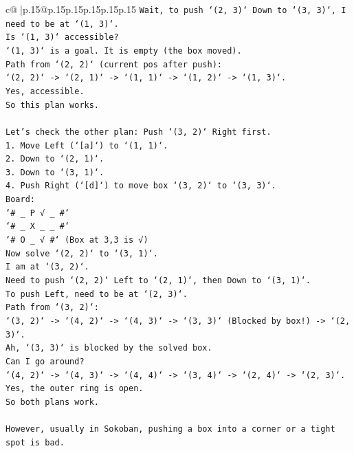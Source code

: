 \documentclass{article}
\begin{document}
{\begin{supertabular}{c@{$\;$}|p{.15\linewidth}@{}p{.15\linewidth}p{.15\linewidth}p{.15\linewidth}p{.15\linewidth}p{.15\linewidth}}
{{{\texttt{Wait, to push `(2, 3)` Down to `(3, 3)`, I need to be at `(1, 3)`.} \\
\texttt{Is `(1, 3)` accessible?} \\
\texttt{`(1, 3)` is a goal. It is empty (the box moved).} \\
\texttt{Path from `(2, 2)` (current pos after push):} \\
\texttt{`(2, 2)` {-}> `(2, 1)` {-}> `(1, 1)` {-}> `(1, 2)` {-}> `(1, 3)`.} \\
\texttt{Yes, accessible.} \\
\texttt{So this plan works.} \\
\\ 
\texttt{Let's check the other plan: Push `(3, 2)` Right first.} \\
\texttt{1. Move Left (`{[}a{]}`) to `(1, 1)`.} \\
\texttt{2. Down to `(2, 1)`.} \\
\texttt{3. Down to `(3, 1)`.} \\
\texttt{4. Push Right (`{[}d{]}`) to move box `(3, 2)` to `(3, 3)`.} \\
\texttt{Board:} \\
\texttt{`\# \_ P √ \_ \#`} \\
\texttt{`\# \_ X \_ \_ \#`} \\
\texttt{`\# O \_ √ \#` (Box at 3,3 is √)} \\
\texttt{Now solve `(2, 2)` to `(3, 1)`.} \\
\texttt{I am at `(3, 2)`.} \\
\texttt{Need to push `(2, 2)` Left to `(2, 1)`, then Down to `(3, 1)`.} \\
\texttt{To push Left, need to be at `(2, 3)`.} \\
\texttt{Path from `(3, 2)`:} \\
\texttt{`(3, 2)` {-}> `(4, 2)` {-}> `(4, 3)` {-}> `(3, 3)` (Blocked by box!) {-}> `(2, 3)`.} \\
\texttt{Ah, `(3, 3)` is blocked by the solved box.} \\
\texttt{Can I go around?} \\
\texttt{`(4, 2)` {-}> `(4, 3)` {-}> `(4, 4)` {-}> `(3, 4)` {-}> `(2, 4)` {-}> `(2, 3)`.} \\
\texttt{Yes, the outer ring is open.} \\
\texttt{So both plans work.} \\
\\ 
\texttt{However, usually in Sokoban, pushing a box into a corner or a tight spot is bad.} \\
}}}
\end{supertabular}}
\end{document}
